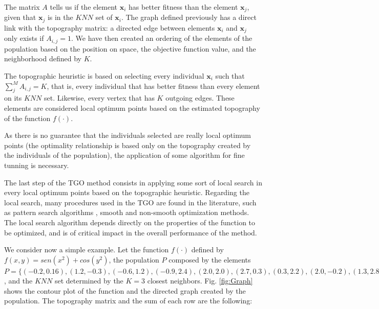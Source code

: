 The matrix $A$ tells us if the element $\bm{x}_i$ has better fitness than the element $\bm{x}_j$, given that $\bm{x}_j$ is in the $KNN$ set of $\bm{x}_i$. The graph defined previously has a direct link with the topography matrix: a directed edge between elements $\bm{x}_i$ and $\bm{x}_j$ only exists if $A_{i, j} = 1$. We have then created an ordering of the elements of the population based on the position on space, the objective function value, and the neighborhood defined by $K$.

The topographic heuristic is based on selecting every individual $\bm{x}_i$ such that $\sum_j^M A_{i, j} = K$, that is, every individual that has better fitness than every element on its $KNN$ set. Likewise, every vertex that has $K$ outgoing edges. These elements are considered local optimum points based on the estimated topography of the function $f(\cdot)$.

As there is no guarantee that the individuals selected are really local optimum points (the optimality relationship is based only on the topography created by the individuals of the population), the application of 
some algorithm for fine tunning is necessary.

The last step of the TGO method consists in applying some sort of local search in every local optimum points based on the topographic heuristic. Regarding the local search, many procedures used in the TGO are found in the literature, such as pattern search algorithms \citep{ITGO2}, smooth \citep{ITGO3} and non-smooth \citep{ITGO4} optimization methods. The local search algorithm depends directly on the properties of the function to be optimized, and is of critical impact in the overall performance of the method.

We consider now a simple example. Let the function $f(\cdot)$ defined by $f(x, y) = sen(x^2) + cos(y^2)$, the population $P$ composed by the elements $P = \{(-0.2, 0.16), (1.2, -0.3), \allowbreak (-0.6, 1.2), \allowbreak (-0.9, 2.4), \allowbreak (2.0, 2.0), \allowbreak (2.7, 0.3), \allowbreak (0.3, 2.2), \allowbreak (2.0, -0.2), (1.3, 2.8), (1.3, 1.2)\}$, and the $KNN$ set determined by the $K = 3$ closest neighbors. Fig. \ref{fig:Graph} shows the contour plot of the function and the directed graph created by the population. The topography matrix and the sum of each row are the following:

